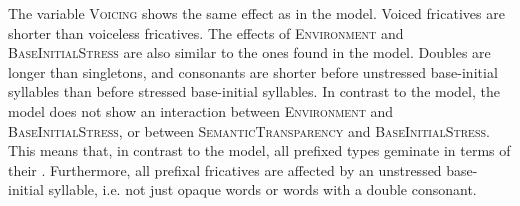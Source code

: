     \begin{table}
    	\caption{ Summary of linear model for variables predicting the relative  duration of [s] in prefixed words}
    	\label{tbl: summary model5}
    	
    	
    \end{table}
  
The variable \textsc{Voicing} shows the same effect as in the  model. Voiced fricatives are shorter than voiceless fricatives.
The effects of \textsc{Environment} and \textsc{BaseInitialStress} are also similar to the ones found in the  model. Doubles are longer than singletons, and consonants are shorter before unstressed base-initial syllables than before stressed base-initial syllables. 
In contrast to the  model, the  model does not show an interaction between \textsc{Environment} and \textsc{BaseInitialStress}, or between \textsc{SemanticTransparency} and \textsc{BaseInitialStress}. This means that, in contrast to the  model,  all prefixed types geminate in terms of their . Furthermore, all prefixal fricatives are affected by an unstressed base-initial syllable, i.e. not just opaque words or words with a double consonant.

